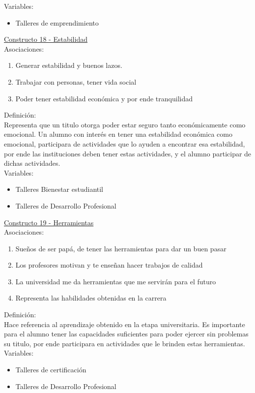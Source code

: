 Variables:
\begin{itemize}
	\item Talleres de emprendimiento	
\end{itemize} 

\underline {Constructo 18 - Estabilidad} \\
Asociaciones:
\begin{enumerate}
	\item Generar estabilidad y buenos lazos.
	\item Trabajar con personas, tener vida social 	
	\item Poder tener estabilidad económica y por ende tranquilidad
\end{enumerate}

Definición:\\
Representa que un titulo otorga poder estar seguro tanto económicamente como emocional. Un alumno con interés en tener una estabilidad económica como emocional, participara de actividades que lo ayuden a encontrar esa estabilidad, por ende las instituciones deben tener estas actividades, y el alumno participar de dichas actividades.\\

Variables:
\begin{itemize}
	\item Talleres Bienestar estudiantil
	\item Talleres de Desarrollo Profesional	
\end{itemize} 


\underline {Constructo 19 - Herramientas} \\
Asociaciones:
\begin{enumerate}
	\item Sueños de ser papá, de tener las herramientas para dar un buen pasar
	\item Los profesores motivan y te enseñan hacer trabajos de calidad	
	\item La universidad me da herramientas que me servirán para el futuro
	\item Representa las habilidades obtenidas en la carrera
\end{enumerate}

Definición:\\
Hace referencia al aprendizaje obtenido en la etapa universitaria. Es importante para el alumno tener las capacidades suficientes para poder ejercer sin problemas su titulo, por ende participara en actividades que le brinden estas herramientas.\\

Variables:
\begin{itemize}
	\item Talleres de certificación
	\item Talleres de Desarrollo Profesional	
\end{itemize} 

